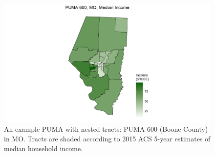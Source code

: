 \documentclass[12pt]{article}
\begin{document}
\begin{figure}
\centering
\includegraphics[scale = 0.9]{median_mo_map_big.png}
\caption{An example PUMA with nested tracts: PUMA 600 (Boone County) in MO. Tracts are shaded according to 2015 ACS 5-year estimates of median household income.}
\label{fig:boonepuma}
\end{figure}
\end{document}
